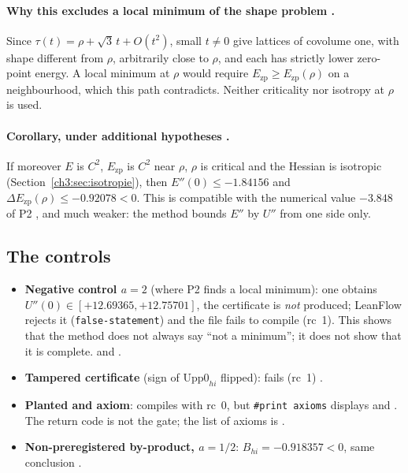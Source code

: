 \paragraph{Why this excludes a local minimum of the shape problem \tierC.} Since $\tau(t)=\rho+\sqrt3\,t+O(t^2)$,
small $t\ne0$ give lattices of covolume one, with shape different from $\rho$, arbitrarily close to $\rho$,
and each has strictly lower zero-point energy. A local minimum at $\rho$ would require
$E_{\mathrm{zp}}\ge E_{\mathrm{zp}}(\rho)$ on a neighbourhood, which this path contradicts. Neither criticality nor
isotropy at $\rho$ is used.

\paragraph{Corollary, under additional hypotheses \tierC.} If moreover $E$ is $C^2$, $E_{\mathrm{zp}}$ is $C^2$
near $\rho$, $\rho$ is critical and the Hessian is isotropic (Section~\ref{ch3:sec:isotropie}), then
$E''(0)\le-1.84156$ and $\Delta E_{\mathrm{zp}}(\rho)\le-0.92078<0$. This is compatible with the numerical value
$-3.848$ of P2 \tierX, and much weaker: the method bounds $E''$ by $U''$ from one side only.

\subsection{The controls}\label{ch3:sec:controlesb2}
\begin{itemize}
\item \textbf{Negative control $a=2$} (where P2 finds a local minimum): one obtains $U''(0)\in[+12.69365, +12.75701]$,
the certificate is \emph{not} produced; LeanFlow rejects it (\texttt{false-statement}) and the file 
fails to compile (rc~1). This shows that the method does not always say ``not a minimum''; it does not show
that it is complete. \tierC{} and \tierAs.
\item \textbf{Tampered certificate} (sign of $\mathrm{Upp0}_{hi}$ flipped):  fails (rc~1) \tierAs.
\item \textbf{Planted  and axiom}:  compiles with rc~0, but \texttt{\#print axioms}
displays  and . The return code is not the gate; the list of axioms
is \tierAs.
\item \textbf{Non-preregistered by-product, $a=1/2$}: $B_{hi}=-0.918357<0$, same conclusion \tierC.
\end{itemize}

